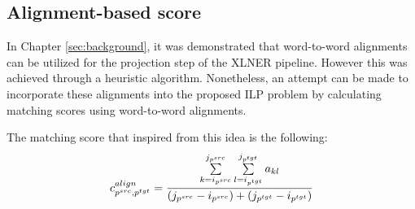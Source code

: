 \subsection{Alignment-based score}
In Chapter \ref{sec:background}, it was demonstrated that word-to-word alignments
can be utilized for the projection step of the XLNER pipeline. However this was
achieved through a heuristic algorithm. Nonetheless, an attempt can be made to
incorporate these alignments into the proposed ILP problem by calculating matching
scores using word-to-word alignments.

The matching score that inspired from this idea is the following:
\begin{equation} \label{eq:align_cost}
  c_{p^{src}, p^{tgt}}^{align} =
  \frac{\sum\limits_{k=i_{p^{src}}}^{j_{p^{src}}} \sum\limits_{l=i_{p^{tgt}}}^{j_{p^{tgt}}} a_{kl}}
  {(j_{p^{src}} - i_{p^{src}}) + (j_{p^{tgt}} - i_{p^{tgt}})}
\end{equation}

